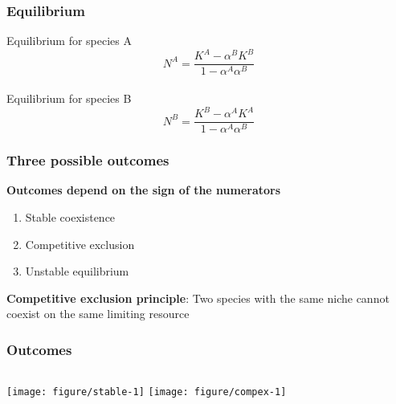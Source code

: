 \documentclass[color=usenames,dvipsnames]{beamer}\usepackage[]{graphicx}\usepackage[]{color}
\begin{document}
\begin{frame}
  \frametitle{Equilibrium}
  \Large
  Equilibrium for species A
  \[
    N^A = \frac{K^A - \alpha^B K^B}{1 - \alpha^A \alpha^B}
  \] \\
  \vspace{1cm}
  \pause
  Equilibrium for species B
  \[
    N^B = \frac{K^B - \alpha^A K^A}{1 - \alpha^A \alpha^B}
  \]
\end{frame}


\begin{frame}
  \frametitle{Three possible outcomes}
  \large
  {\bf Outcomes depend on the sign of the numerators}
  \begin{enumerate}[(1)]
    \item Stable coexistence
    \item Competitive exclusion
    \item Unstable equilibrium
  \end{enumerate}
  \pause
  \vfill
    \large %
    {\bf Competitive exclusion principle}:
    Two species with the same niche cannot coexist on the same limiting resource
\end{frame}






\begin{frame}
  \frametitle{Outcomes}
  \vspace{-1cm}


\begin{columns}
  \column{\dimexpr\paperwidth-10pt}
    \texttt{[image: figure/stable-1]}
    \texttt{[image: figure/compex-1]}
\end{columns}
\end{frame}
\end{document}
